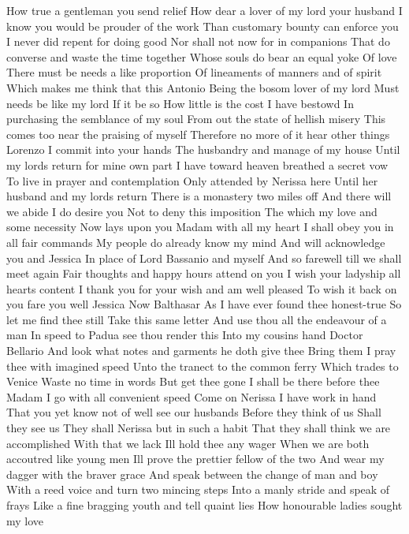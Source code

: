 How true a gentleman you send relief 
How dear a lover of my lord your husband 
I know you would be prouder of the work 
Than customary bounty can enforce you 
I never did repent for doing good 
Nor shall not now for in companions 
That do converse and waste the time together 
Whose souls do bear an equal yoke Of love 
There must be needs a like proportion 
Of lineaments of manners and of spirit 
Which makes me think that this Antonio 
Being the bosom lover of my lord 
Must needs be like my lord If it be so 
How little is the cost I have bestowd 
In purchasing the semblance of my soul 
From out the state of hellish misery 
This comes too near the praising of myself 
Therefore no more of it hear other things 
Lorenzo I commit into your hands 
The husbandry and manage of my house 
Until my lords return for mine own part 
I have toward heaven breathed a secret vow 
To live in prayer and contemplation 
Only attended by Nerissa here 
Until her husband and my lords return 
There is a monastery two miles off 
And there will we abide I do desire you 
Not to deny this imposition 
The which my love and some necessity 
Now lays upon you 
Madam with all my heart 
I shall obey you in all fair commands 
My people do already know my mind 
And will acknowledge you and Jessica 
In place of Lord Bassanio and myself 
And so farewell till we shall meet again 
Fair thoughts and happy hours attend on you 
I wish your ladyship all hearts content 
I thank you for your wish and am well pleased 
To wish it back on you fare you well Jessica 
Now Balthasar 
As I have ever found thee honest-true 
So let me find thee still Take this same letter 
And use thou all the endeavour of a man 
In speed to Padua see thou render this 
Into my cousins hand Doctor Bellario 
And look what notes and garments he doth give thee 
Bring them I pray thee with imagined speed 
Unto the tranect to the common ferry 
Which trades to Venice Waste no time in words 
But get thee gone I shall be there before thee 
Madam I go with all convenient speed 
Come on Nerissa I have work in hand 
That you yet know not of well see our husbands 
Before they think of us 
Shall they see us 
They shall Nerissa but in such a habit 
That they shall think we are accomplished 
With that we lack Ill hold thee any wager 
When we are both accoutred like young men 
Ill prove the prettier fellow of the two 
And wear my dagger with the braver grace 
And speak between the change of man and boy 
With a reed voice and turn two mincing steps 
Into a manly stride and speak of frays 
Like a fine bragging youth and tell quaint lies 
How honourable ladies sought my love 
